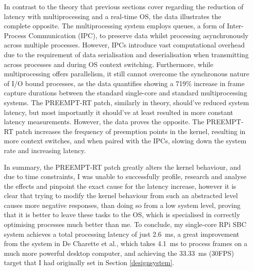 In contrast to the theory that previous sections cover regarding the reduction of latency with multiprocessing and a real-time OS, the data illustrates the complete opposite. The multiprocessing system employs queues, a form of Inter-Process Communication (IPC), to preserve data whilst processing asynchronously across multiple processes. However, IPCs introduce vast computational overhead due to the requirement of data serialisation and deserialisation when transmitting across processes and during OS context switching. Furthermore, while multiprocessing offers parallelism, it still cannot overcome the synchronous nature of I/O bound processes, as the data quantifies showing a 719\% increase in frame capture durations between the standard single-core and standard multiprocessing systems. The PREEMPT-RT patch, similarly in theory, should've reduced system latency, but most importantly it should've at least resulted in more constant latency measurements. However, the data proves the opposite. The PREEMPT-RT patch increases the frequency of preemption points in the kernel, resulting in more context switches, and when paired with the IPCs, slowing down the system rate and increasing latency.

In summary, the PREEMPT-RT patch greatly alters the kernel behaviour, and due to time constraints, I was unable to successfully profile, research and analyse the effects and pinpoint the exact cause for the latency increase, however it is clear that trying to modify the kernel behaviour from such an abstracted level causes more negative responses, than doing so from a low system level, proving that it is better to leave these tasks to the OS, which is specialised in correctly optimising processes much better than me. To conclude, my single-core RPi SBC system achieves a total processing latency of just \SI{2.6}{\milli\second}, a great improvement from the system in De Charette et al., which takes \SI{4.1}{\milli\second} to process frames on a much more powerful desktop computer, and achieving the \SI{33.33}{\milli\second} (30FPS) target that I had originally set in Section \ref{designsystem}.
